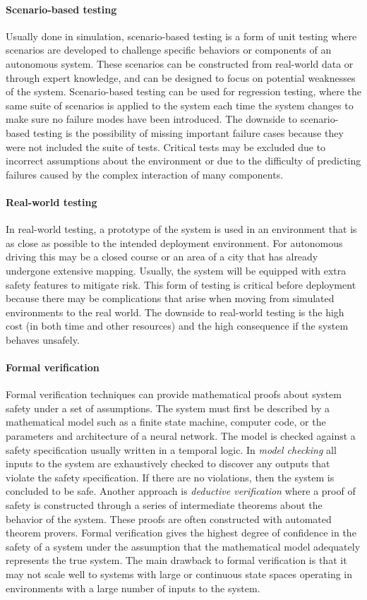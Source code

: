 \paragraph{Scenario-based testing} Usually done in simulation, scenario-based testing is a form of unit testing where scenarios are developed to challenge specific behaviors or components of an autonomous system. These scenarios can be constructed from real-world data or through expert knowledge, and can be designed to focus on potential weaknesses of the system. Scenario-based testing can be used for regression testing, where the same suite of scenarios is applied to the system each time the system changes to make sure no failure modes have been introduced. The downside to scenario-based testing is the possibility of missing important failure cases because they were not included the suite of tests. Critical tests may be excluded due to incorrect assumptions about the environment or due to the difficulty of predicting failures caused by the complex interaction of many components.

\paragraph{Real-world testing} In real-world testing, a prototype of the system is used in an environment that is as close as possible to the intended deployment environment. For autonomous driving this may be a closed course or an area of a city that has already undergone extensive mapping. Usually, the system will be equipped with extra safety features to mitigate risk. This form of testing is critical before deployment because there may be complications that arise when moving from simulated environments to the real world. The downside to real-world testing is the high cost (in both time and other resources) and the high consequence if the system behaves unsafely.

\paragraph{Formal verification} Formal verification techniques can provide mathematical proofs about system safety under a set of assumptions. The system must first be described by a mathematical model such as a finite state machine, computer code, or the parameters and architecture of a neural network. The model is checked against a safety specification usually written in a temporal logic. In \emph{model checking} all inputs to the system are exhaustively checked to discover any outputs that violate the safety specification. If there are no violations, then the system is concluded to be safe. Another approach is \emph{deductive verification} where a proof of safety is constructed through a series of intermediate theorems about the behavior of the system. These proofs are often constructed with automated theorem provers. Formal verification gives the highest degree of confidence in the safety of a system under the assumption that the mathematical model adequately represents the true system. The main drawback to formal verification is that it may not scale well to systems with large or continuous state spaces operating in environments with a large number of inputs to the system. 

